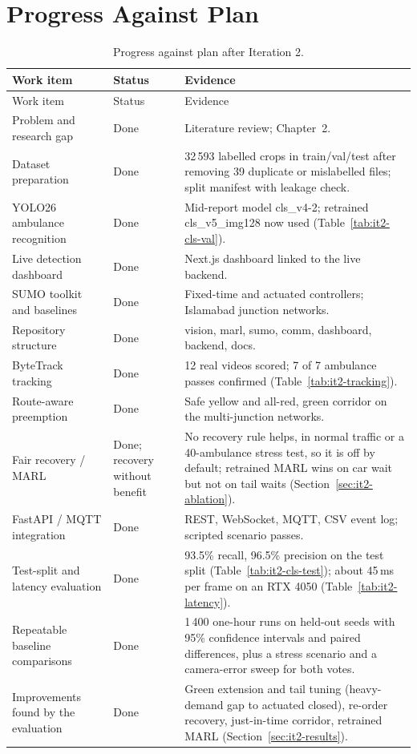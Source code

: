 \section{Progress Against Plan}
\begin{longtable}{p{}p{}p{}}
\caption{Progress against plan after Iteration 2.}\label{tab:progress}\\
\toprule
Work item & Status & Evidence\\
\midrule
\endfirsthead
\toprule
Work item & Status & Evidence\\
\midrule
\endhead
Problem and research gap & Done & Literature review; Chapter~2.\\
Dataset preparation & Done & 32\,593 labelled crops in train/val/test after removing 39 duplicate or
mislabelled files; split manifest with leakage check.\\
YOLO26 ambulance recognition & Done & Mid-report model cls\_v4-2; retrained cls\_v5\_img128 now used
(Table~\ref{tab:it2-cls-val}).\\
Live detection dashboard & Done & Next.js dashboard linked to the live backend.\\
SUMO toolkit and baselines & Done & Fixed-time and actuated controllers; Islamabad junction networks.\\
Repository structure & Done & vision, marl, sumo, comm, dashboard, backend, docs.\\
ByteTrack tracking & Done & 12 real videos scored; 7 of 7 ambulance passes confirmed
(Table~\ref{tab:it2-tracking}).\\
Route-aware preemption & Done & Safe yellow and all-red, green corridor on the multi-junction networks.\\
Fair recovery / MARL & Done; recovery without benefit & No recovery rule helps, in normal traffic or a
40-ambulance stress test, so it is off by default; retrained MARL wins on car wait but not on tail waits
(Section~\ref{sec:it2-ablation}).\\
FastAPI / MQTT integration & Done & REST, WebSocket, MQTT, CSV event log; scripted scenario passes.\\
Test-split and latency evaluation & Done & 93.5\% recall, 96.5\% precision on the test split
(Table~\ref{tab:it2-cls-test}); about 45\,ms per frame on an RTX 4050 (Table~\ref{tab:it2-latency}).\\
Repeatable baseline comparisons & Done & 1\,400 one-hour runs on held-out seeds with 95\% confidence intervals
and paired differences, plus a stress scenario and a camera-error sweep for both votes.\\
Improvements found by the evaluation & Done & Green extension and tail tuning (heavy-demand gap to actuated
closed), re-order recovery, just-in-time corridor, retrained MARL (Section~\ref{sec:it2-results}).\\
\bottomrule
\end{longtable}

